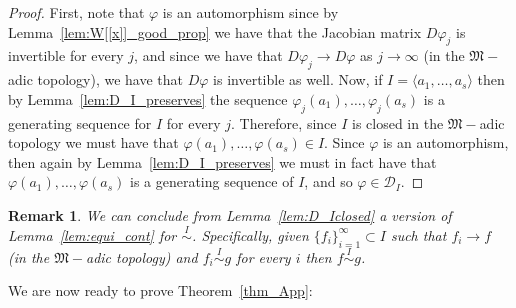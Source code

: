 \documentclass{article}
\newtheorem{remark}[theorem]{Remark}
\newcommand{\equivd}{\overset{I}{\sim}}
\numberwithin{theorem}{section}
\begin{document}
\begin{proof}
    First, note that $\varphi$ is an automorphism since by Lemma~\ref{lem:W[[x]]_good_prop} we have that the Jacobian matrix $D\varphi_j$ is invertible for every $j$, and since we have that $D\varphi_j \to D\varphi$ as $j \to \infty$ (in the $\mathfrak{M}-$adic topology), we have that $D\varphi$ is invertible as well. Now, if $I=\langle a_1, \dots, a_s \rangle$ then by Lemma~\ref{lem:D_I_preserves} the sequence $\varphi_j(a_1), \dots, \varphi_j(a_s)$ is a generating sequence for $I$ for every $j$. Therefore, since $I$ is closed in the $\mathfrak{M}-$adic topology we must have that $\varphi(a_1), \dots, \varphi(a_s) \in I$. Since $\varphi$ is an automorphism, then again by Lemma~\ref{lem:D_I_preserves} we must in fact have that $\varphi(a_1), \dots, \varphi(a_s)$ is a generating sequence of $I$, and so $\varphi \in \mathcal{D}_I$. 
\end{proof}

\begin{remark}
    \textup{We can conclude from Lemma~\ref{lem:D_Iclosed} a version of Lemma~\ref{lem:equi_cont} for $\equivd$. Specifically, given $\{f_i\}_{i=1}^\infty \subset I$ such that $f_i \to f$ (in the $\mathfrak{M}-$adic topology) and $f_i \equivd g$ for every $i$ then $f \equivd g$.    }
\end{remark}


We are now ready to prove Theorem~\ref{thm_App}:
\end{document}
